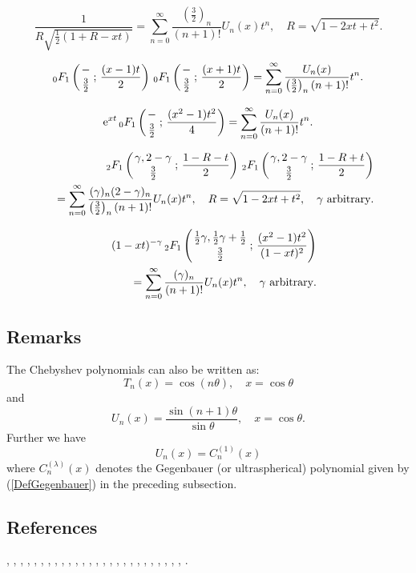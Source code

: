 \documentclass[envcountchap,graybox]{svmono}
\newcommand{\hyp}[5]{\mbox{}_{#1}{F}_{#2}
\left(\genfrac{}{}{0pt}{}{#3}{#4}\,;\,#5\right)}
\newcommand{\e}{\textrm{e}}
\begin{document}
\begin{equation}
\label{GenChebyshevII2}
\frac{1}{R\sqrt{\frac{1}{2}(1+R-xt)}}=\sum_{n=0}^{\infty}
\frac{\left(\frac{3}{2}\right)_n}{(n+1)!}U_n(x)t^n,\quad R=\sqrt{1-2xt+t^2}.
\end{equation}

\begin{equation}
\label{GenChebyshevII3}
\hyp{0}{1}{-}{\frac{3}{2}}{\frac{(x-1)t}{2}}\,
\hyp{0}{1}{-}{\frac{3}{2}}{\frac{(x+1)t}{2}}=
\sum_{n=0}^{\infty}\frac{U_n(x)}{\left(\frac{3}{2}\right)_n(n+1)!}t^n.
\end{equation}

\begin{equation}
\label{GenChebyshevII4}
\e^{xt}\,\hyp{0}{1}{-}{\frac{3}{2}}{\frac{(x^2-1)t^2}{4}}=
\sum_{n=0}^{\infty}\frac{U_n(x)}{(n+1)!}t^n.
\end{equation}

\begin{eqnarray}
\label{GenChebyshevII5}
& &\hyp{2}{1}{\gamma,2-\gamma}{\frac{3}{2}}{\frac{1-R-t}{2}}\,
\hyp{2}{1}{\gamma,2-\gamma}{\frac{3}{2}}{\frac{1-R+t}{2}}\nonumber\\
& &{}=\sum_{n=0}^{\infty}\frac{(\gamma)_n(2-\gamma)_n}{\left(\frac{3}{2}\right)_n(n+1)!}U_n(x)t^n,
\quad R=\sqrt{1-2xt+t^2},\quad\textrm{$\gamma$ arbitrary}.
\end{eqnarray}

\begin{eqnarray}
\label{GenChebyshevII6}
& &(1-xt)^{-\gamma}\,\hyp{2}{1}{\frac{1}{2}\gamma,\frac{1}{2}\gamma+\frac{1}{2}}{\frac{3}{2}}
{\frac{(x^2-1)t^2}{(1-xt)^2}}\nonumber\\
& &{}=\sum_{n=0}^{\infty}\frac{(\gamma)_n}{(n+1)!}U_n(x)t^n,\quad\textrm{$\gamma$ arbitrary}.
\end{eqnarray}

\subsection*{Remarks}
The Chebyshev polynomials can also be written as:
$$T_n(x)=\cos(n\theta),\quad x=\cos\theta$$
and
$$U_n(x)=\frac{\sin (n+1)\theta}{\sin\theta},\quad x=\cos\theta.$$
Further we have
$$U_n(x)=C_n^{(1)}(x)$$
where $C_n^{(\lambda)}(x)$ denotes the Gegenbauer (or ultraspherical)
polynomial given by (\ref{DefGegenbauer}) in the preceding subsection.

\subsection*{References}
\cite{Abram}, \cite{AskeyFitch}, \cite{AskeyGasperHarris}, \cite{AskeyIsmail76},
\cite{Bavinck95}, \cite{Chihara78}, \cite{Danese}, \cite{DilcherStolarsky},
\cite{Erdelyi+}, \cite{Grad}, \cite{HartmannStephan}, \cite{Ismail2005II}, \cite{Koekoek2000},
\cite{Luke}, \cite{Mathai}, \cite{Nikiforov+}, \cite{NikiforovUvarov}, \cite{Rainville},
\cite{Rayes+}, \cite{Rivlin}, \cite{SainteViennot}, \cite{Szego75}, \cite{Temme},
\cite{Wilson70I}, \cite{Zayed}, \cite{Zhang}, \cite{ZhangWang}.
\end{document}
